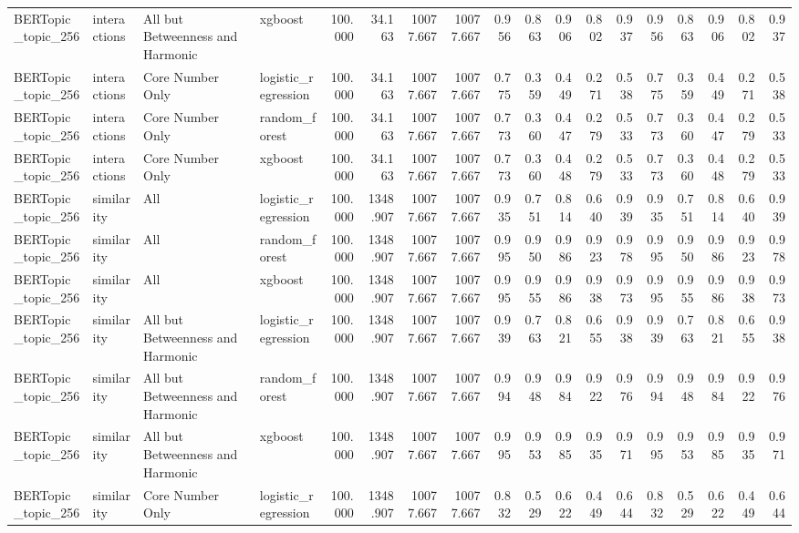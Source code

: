 \begin{tabular}{llllrrrrrrrrrrrrrr}
BERTopic_topic_256 & interactions & All but Betweenness and Harmonic & xgboost & 100.000 & 34.163 & 10077.667 & 10077.667 & 0.956 & 0.863 & 0.906 & 0.802 & 0.937 & 0.956 & 0.863 & 0.906 & 0.802 & 0.937 \\
BERTopic_topic_256 & interactions & Core Number Only & logistic_regression & 100.000 & 34.163 & 10077.667 & 10077.667 & 0.775 & 0.359 & 0.449 & 0.271 & 0.538 & 0.775 & 0.359 & 0.449 & 0.271 & 0.538 \\
BERTopic_topic_256 & interactions & Core Number Only & random_forest & 100.000 & 34.163 & 10077.667 & 10077.667 & 0.773 & 0.360 & 0.447 & 0.279 & 0.533 & 0.773 & 0.360 & 0.447 & 0.279 & 0.533 \\
BERTopic_topic_256 & interactions & Core Number Only & xgboost & 100.000 & 34.163 & 10077.667 & 10077.667 & 0.773 & 0.360 & 0.448 & 0.279 & 0.533 & 0.773 & 0.360 & 0.448 & 0.279 & 0.533 \\
BERTopic_topic_256 & similarity & All & logistic_regression & 100.000 & 1348.907 & 10077.667 & 10077.667 & 0.935 & 0.751 & 0.814 & 0.640 & 0.939 & 0.935 & 0.751 & 0.814 & 0.640 & 0.939 \\
BERTopic_topic_256 & similarity & All & random_forest & 100.000 & 1348.907 & 10077.667 & 10077.667 & 0.995 & 0.950 & 0.986 & 0.923 & 0.978 & 0.995 & 0.950 & 0.986 & 0.923 & 0.978 \\
BERTopic_topic_256 & similarity & All & xgboost & 100.000 & 1348.907 & 10077.667 & 10077.667 & 0.995 & 0.955 & 0.986 & 0.938 & 0.973 & 0.995 & 0.955 & 0.986 & 0.938 & 0.973 \\
BERTopic_topic_256 & similarity & All but Betweenness and Harmonic & logistic_regression & 100.000 & 1348.907 & 10077.667 & 10077.667 & 0.939 & 0.763 & 0.821 & 0.655 & 0.938 & 0.939 & 0.763 & 0.821 & 0.655 & 0.938 \\
BERTopic_topic_256 & similarity & All but Betweenness and Harmonic & random_forest & 100.000 & 1348.907 & 10077.667 & 10077.667 & 0.994 & 0.948 & 0.984 & 0.922 & 0.976 & 0.994 & 0.948 & 0.984 & 0.922 & 0.976 \\
BERTopic_topic_256 & similarity & All but Betweenness and Harmonic & xgboost & 100.000 & 1348.907 & 10077.667 & 10077.667 & 0.995 & 0.953 & 0.985 & 0.935 & 0.971 & 0.995 & 0.953 & 0.985 & 0.935 & 0.971 \\
BERTopic_topic_256 & similarity & Core Number Only & logistic_regression & 100.000 & 1348.907 & 10077.667 & 10077.667 & 0.832 & 0.529 & 0.622 & 0.449 & 0.644 & 0.832 & 0.529 & 0.622 & 0.449 & 0.644 \\

\end{tabular}

